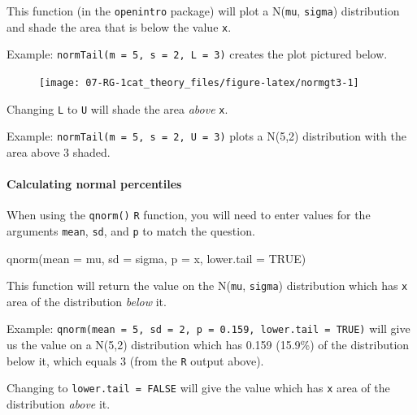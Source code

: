 \documentclass[
]{report}
\newenvironment{Shaded}{\begin{snugshade}}{\end{snugshade}}
\newcommand{\AttributeTok}[1]{\textcolor[rgb]{0.77,0.63,0.00}{#1}}
\newcommand{\ConstantTok}[1]{\textcolor[rgb]{0.00,0.00,0.00}{#1}}
\newcommand{\FunctionTok}[1]{\textcolor[rgb]{0.00,0.00,0.00}{#1}}
\newcommand{\NormalTok}[1]{#1}
\begin{document}
This function (in the \texttt{openintro} package) will plot a N(\texttt{mu}, \texttt{sigma}) distribution and shade the area that is below the value \texttt{x}.

Example: \texttt{normTail(m\ =\ 5,\ s\ =\ 2,\ L\ =\ 3)} creates the plot pictured below.

\begin{figure}

{\centering \texttt{[image: 07-RG-1cat\_theory\_files/figure-latex/normgt3-1]} 

}

\end{figure}

Changing \texttt{L} to \texttt{U} will shade the area \emph{above} \texttt{x}.

Example: \texttt{normTail(m\ =\ 5,\ s\ =\ 2,\ U\ =\ 3)} plots a N(5,2) distribution with the area above 3 shaded.

\hypertarget{calculating-normal-percentiles}{%
\paragraph*{Calculating normal percentiles}\label{calculating-normal-percentiles}}

When using the \texttt{qnorm()} \texttt{R} function, you will need to enter values for the arguments \texttt{mean}, \texttt{sd}, and \texttt{p} to match the question.

\begin{Shaded}
\begin{Highlighting}[]
\FunctionTok{qnorm}\NormalTok{(}\AttributeTok{mean =}\NormalTok{ mu, }\AttributeTok{sd =}\NormalTok{ sigma, }\AttributeTok{p =}\NormalTok{ x, }\AttributeTok{lower.tail =} \ConstantTok{TRUE}\NormalTok{)}
\end{Highlighting}
\end{Shaded}

This function will return the value on the N(\texttt{mu}, \texttt{sigma}) distribution which has \texttt{x} area of the distribution \emph{below} it.

Example: \texttt{qnorm(mean\ =\ 5,\ sd\ =\ 2,\ p\ =\ 0.159,\ lower.tail\ =\ TRUE)} will give us the value on a N(5,2) distribution which has 0.159 (15.9\%) of the distribution below it, which equals 3 (from the \texttt{R} output above).

Changing to \texttt{lower.tail\ =\ FALSE} will give the value which has \texttt{x} area of the distribution \emph{above} it.
\end{document}
